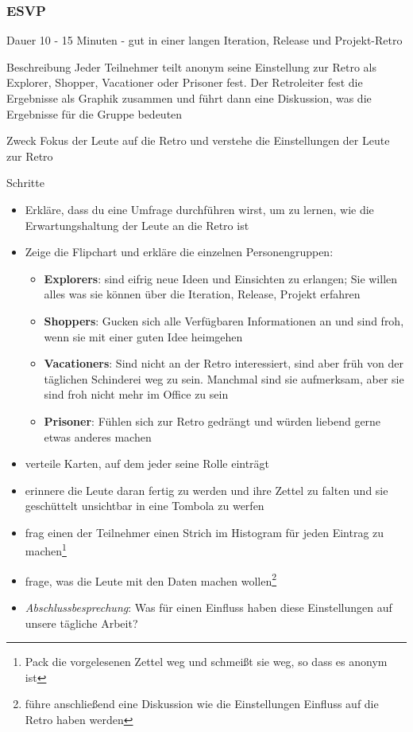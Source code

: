 \subsubsection{ESVP}
\begin{Beschreibungfett}[Beschreibung]
\item [Dauer] 10 - 15 Minuten - gut in einer langen Iteration, Release und
    Projekt-Retro
  \item [Beschreibung] Jeder Teilnehmer teilt anonym seine Einstellung zur Retro als
    Explorer, Shopper, Vacationer oder Prisoner fest. Der Retroleiter fest die Ergebnisse als
    Graphik zusammen und führt dann eine Diskussion, was die Ergebnisse für die Gruppe bedeuten
  \item [Zweck] Fokus der Leute auf die Retro und verstehe die Einstellungen der Leute
    zur Retro
  \item [Schritte]
    \begin{itemize}
      \item Erkläre, dass du eine Umfrage durchführen wirst, um zu lernen, wie die
        Erwartungshaltung der Leute an die Retro ist
      \item Zeige die Flipchart und erkläre die einzelnen Personengruppen:
        \begin{itemize}
          \item \textbf{Explorers}: sind eifrig neue Ideen und Einsichten zu erlangen; Sie
            willen alles was sie können über die Iteration, Release, Projekt erfahren
          \item \textbf{Shoppers}: Gucken sich alle Verfügbaren Informationen an und sind froh,
            wenn sie mit einer guten Idee heimgehen
          \item \textbf{Vacationers}: Sind nicht an der Retro interessiert, sind aber früh von der
            täglichen Schinderei weg zu sein. Manchmal sind sie aufmerksam, aber sie sind froh
            nicht mehr im Office zu sein
          \item \textbf{Prisoner}: Fühlen sich zur Retro gedrängt und würden liebend gerne
            etwas anderes machen
        \end{itemize}
      \item verteile Karten, auf dem jeder seine Rolle einträgt
      \item erinnere die Leute daran fertig zu werden und ihre Zettel zu falten und sie
        geschüttelt unsichtbar in eine Tombola zu werfen
      \item frag einen der Teilnehmer einen Strich im Histogram für jeden Eintrag zu
        machen\footnote{Pack die vorgelesenen Zettel weg und schmeißt sie weg, so dass es anonym
          ist}
      \item frage, was die Leute mit den Daten machen wollen\footnote{führe anschließend
          eine Diskussion
          wie die Einstellungen Einfluss auf die Retro haben werden}
      \item \textit{Abschlussbesprechung}: Was für einen Einfluss haben diese Einstellungen auf unsere
        tägliche Arbeit?
    \end{itemize}
\end{Beschreibungfett}


